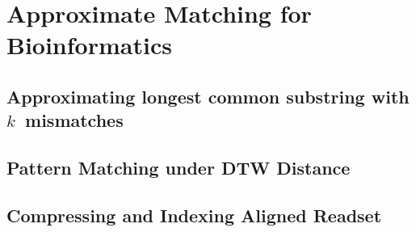 \part{Approximate Matching for Bioinformatics}\label{part:approx-bio}

\mainmatter
\chapter{Approximating longest common substring with \texorpdfstring{$k$}{k}~mismatches}\label{chap:LCS}%

\mainmatter
\chapter{Pattern Matching under DTW Distance}\label{chap:DTW}

\mainmatter
\chapter{Compressing and Indexing Aligned Readset}\label{chap:XBWT}

